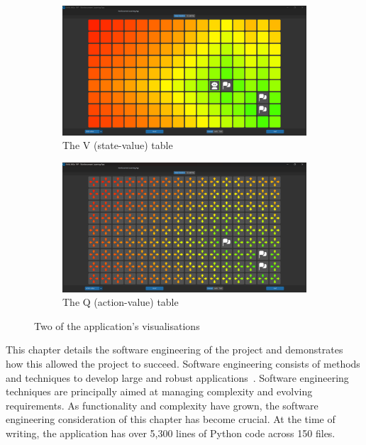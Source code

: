 \documentclass[]{final_report}
\begin{document}
\begin{figure}[H]
  \centering
  \begin{subfigure}{.5\textwidth}
    \centering
    \includegraphics[width=0.95\linewidth]{state_value}
    \caption[width=0.5\linewidth]{\label{fig:screenshot:state-value-table} The V (state-value) table}
  \end{subfigure}%
  \begin{subfigure}{.5\textwidth}
    \centering
    \includegraphics[width=0.95\linewidth]{action_value}
    \caption[width=0.5\linewidth]{\label{fig:screenshot:action-value-table} The Q (action-value) table}
  \end{subfigure}
  \caption{Two of the application's visualisations}
  \label{fig:app-ui}
\end{figure}

This chapter details the software engineering of the project and demonstrates how this allowed the project to succeed. Software engineering consists of methods and techniques to develop large and robust applications~\cite{van2008software}. Software engineering techniques are principally aimed at managing complexity and evolving requirements. As functionality and complexity have grown, the software engineering consideration of this chapter has become crucial. At the time of writing, the application has over 5,300 lines of Python code across 150 files.
\end{document}
